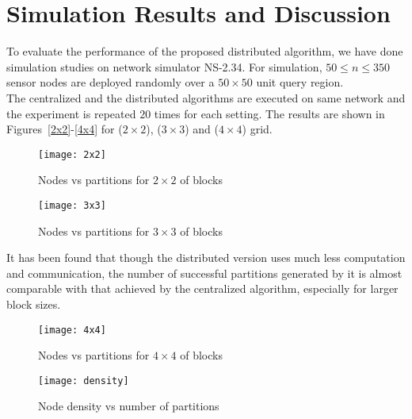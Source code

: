 \documentclass{acm_proc_article-sp}
\begin{document}
\section{Simulation Results and Discussion}
\label{sec_4}
To evaluate the performance of the proposed distributed algorithm, we have done simulation studies on network simulator NS-2.34. For simulation, $50 \leq n \leq 350$ sensor nodes are deployed randomly over a $50\times50$ unit query region.\\
The centralized and the distributed algorithms are executed on same network and the experiment is repeated $20$ times for each setting. The results are shown in Figures~\ref{2x2}-\ref{4x4} for ($2\times 2$), ($3\times 3$) and ($4\times 4$) grid. 
\begin{figure}[ht]
		\begin{minipage}[b]{0.49\linewidth}
		  \centering
		  \texttt{[image: 2x2]}
		  \caption{\scriptsize{Nodes vs partitions for $2\times2$ of blocks}}
		   \label{2x2}
	      \end{minipage}
 	      \hspace{0.1cm}
	      \begin{minipage}[b]{0.49\linewidth}
		  \centering
		  \texttt{[image: 3x3]}
		  \caption{\scriptsize{Nodes vs partitions for $3\times 3$ of blocks}}
		   \label{3x3}
	      \end{minipage}
\end{figure}
It has been found that though the distributed version uses much less computation and communication, the number of successful partitions generated by it is almost comparable with that achieved by the centralized algorithm, especially for larger block sizes. 
 \begin{figure}[ht!]
		\begin{minipage}[b]{0.40\linewidth}
		  \centering
		  \texttt{[image: 4x4]}
		  \caption{\scriptsize{Nodes vs partitions for $4\times 4$ of blocks}}
		   \label{4x4}
	      \end{minipage}
  	      \hspace{0.82cm}
	      \begin{minipage}[b]{0.40\linewidth}
		  \centering
\texttt{[image: density]}
	    		  \caption{\scriptsize{Node density vs number of partitions}}
		 \label{fig_densityvspartition}
		\end{minipage}
\end{figure}
\end{document}
